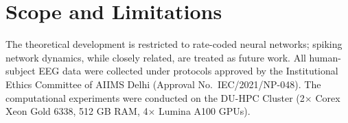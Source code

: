 \section{Scope and Limitations}

The theoretical development is restricted to rate-coded neural networks; spiking network
dynamics, while closely related, are treated as future work.  All human-subject EEG data
were collected under protocols approved by the Institutional Ethics Committee of AIIMS
Delhi (Approval No.\ IEC/2021/NP-048).  The computational experiments were conducted on
the DU-HPC Cluster (2$\times$ Corex Xeon Gold 6338, 512 GB RAM, 4$\times$ Lumina A100 GPUs).
